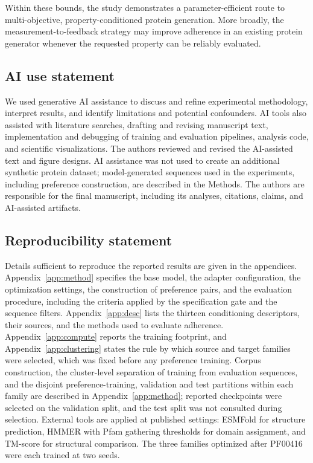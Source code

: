 \documentclass{article} %
\begin{document}
Within these bounds, the study demonstrates a parameter-efficient route to multi-objective, property-conditioned protein generation. More broadly, the measurement-to-feedback strategy may improve adherence in an existing protein generator whenever the requested property can be reliably evaluated.


\subsection*{AI use statement}

We used generative AI assistance to discuss and refine experimental methodology, interpret results, and identify limitations and potential confounders. AI tools also assisted with literature searches, drafting and revising manuscript text, implementation and debugging of training and evaluation pipelines, analysis code, and scientific visualizations. The authors reviewed and revised the AI-assisted text and figure designs. AI assistance was not used to create an additional synthetic protein dataset; model-generated sequences used in the experiments, including preference construction, are described in the Methods. The authors are responsible for the final manuscript, including its analyses, citations, claims, and AI-assisted artifacts.

\subsection*{Reproducibility statement}

Details sufficient to reproduce the reported results are given in the appendices. Appendix~\ref{app:method} specifies the base model, the adapter configuration, the optimization settings, the construction of preference pairs, and the evaluation procedure, including the criteria applied by the specification gate and the sequence filters. Appendix~\ref{app:desc} lists the thirteen conditioning descriptors, their
sources, and the methods used to evaluate adherence. Appendix~\ref{app:compute} reports the training footprint, and Appendix~\ref{app:clustering} states the rule by which source and target families were selected, which was fixed before any preference training. Corpus construction, the cluster-level separation of training from evaluation sequences, and the disjoint preference-training, validation and test partitions within each family are described in Appendix~\ref{app:method}; reported checkpoints were selected on the validation split, and the test split was not consulted during selection. External tools are applied at published settings: ESMFold for structure prediction, HMMER with Pfam gathering thresholds for domain assignment, and TM-score for structural comparison. The three families optimized after PF00416 were each trained at two seeds.
\end{document}
